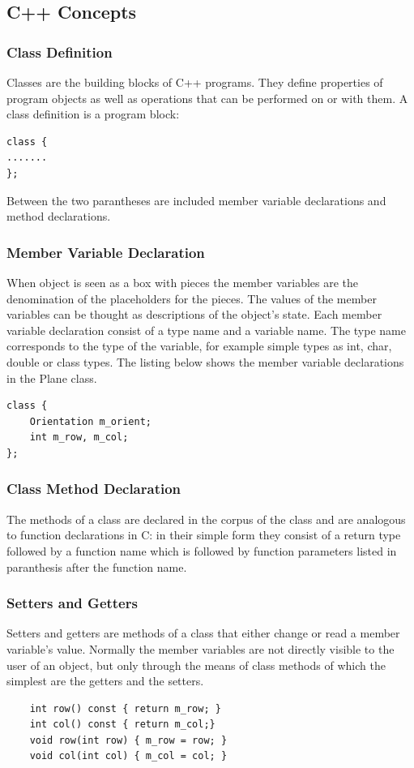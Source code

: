 \subsection {C++ Concepts}

\subsubsection {Class Definition}
Classes are the building blocks of C++ programs. They define properties of program objects as well as operations that can be performed on or with them. A class definition is a program block:
\begin{lstlisting}
class {
.......
};
\end{lstlisting}
Between the two parantheses  are included member variable declarations and method declarations. 

\subsubsection {Member Variable Declaration}
When object is seen as a box with pieces the member variables are the denomination of the placeholders for the pieces. The values of the member variables can be thought as descriptions of the object's state. Each member variable declaration consist of a type name and a variable name. The type name corresponds to the type of the variable, for example simple types as int, char, double or class types.
The listing below shows the member variable declarations in the Plane class.
\begin{lstlisting}
class {
    Orientation m_orient;
    int m_row, m_col;
};
\end{lstlisting}

\subsubsection {Class Method Declaration}
The methods of a class are declared in the corpus of the class and are analogous to function declarations in C: in their simple form they consist of a return type followed by a function name which is followed by function parameters listed in paranthesis after the function name.

\subsubsection {Setters and Getters}
Setters and getters are methods of a class that either change or read a member variable's value. Normally the member variables are not directly visible to the user of an object, but only through the means of class methods of which the simplest are the getters and the setters.
\begin{lstlisting}
    int row() const { return m_row; }
    int col() const { return m_col;}
    void row(int row) { m_row = row; }
    void col(int col) { m_col = col; }
\end{lstlisting}

